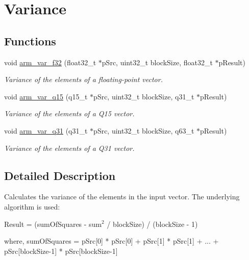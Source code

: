 \hypertarget{group__variance}{\section{Variance}
\label{group__variance}
}
\subsection*{Functions}
\begin{DoxyCompactItemize}
\item 
void \hyperlink{group__variance_ga393f26c5a3bfa05624fb8d32232a6d96}{arm\-\_\-var\-\_\-f32} (float32\-\_\-t $\ast$p\-Src, uint32\-\_\-t block\-Size, float32\-\_\-t $\ast$p\-Result)
\begin{DoxyCompactList}\small\item\em Variance of the elements of a floating-\/point vector. \end{DoxyCompactList}\item 
void \hyperlink{group__variance_ga957b23ddcc2e0883461797ebf8a2cf1f}{arm\-\_\-var\-\_\-q15} (q15\-\_\-t $\ast$p\-Src, uint32\-\_\-t block\-Size, q31\-\_\-t $\ast$p\-Result)
\begin{DoxyCompactList}\small\item\em Variance of the elements of a Q15 vector. \end{DoxyCompactList}\item 
void \hyperlink{group__variance_ga353e4c924e707ab9ee7687d28094a668}{arm\-\_\-var\-\_\-q31} (q31\-\_\-t $\ast$p\-Src, uint32\-\_\-t block\-Size, q63\-\_\-t $\ast$p\-Result)
\begin{DoxyCompactList}\small\item\em Variance of the elements of a Q31 vector. \end{DoxyCompactList}\end{DoxyCompactItemize}


\subsection{Detailed Description}
Calculates the variance of the elements in the input vector. The underlying algorithm is used\-:


\begin{DoxyPre}   
    Result = (sumOfSquares - sum$^{\mbox{2}}$  / blockSize) / (blockSize - 1)\end{DoxyPre}



\begin{DoxyPre}    where, sumOfSquares = pSrc[0] * pSrc[0] + pSrc[1] * pSrc[1] + ... + pSrc[blockSize-1] * pSrc[blockSize-1]\end{DoxyPre}



